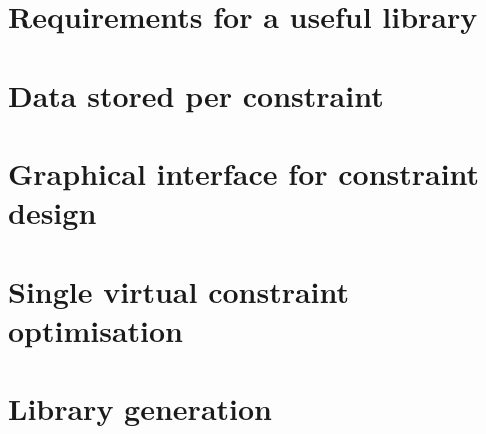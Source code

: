 \section{Requirements for a useful library}


\section{Data stored per constraint}


\section{Graphical interface for constraint design}


\section{Single virtual constraint optimisation}


\section{Library generation} \label{sec:lib}
 